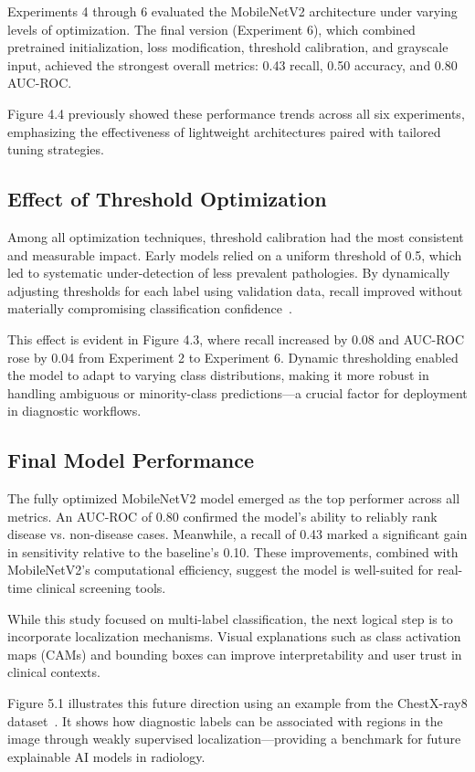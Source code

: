 \documentclass[12pt]{article}
\begin{document}
\begin{multicols}{2}
Experiments 4 through 6 evaluated the MobileNetV2 architecture under varying levels of optimization. The final version (Experiment 6), which combined pretrained initialization, loss modification, threshold calibration, and grayscale input, achieved the strongest overall metrics: 0.43 recall, 0.50 accuracy, and 0.80 AUC-ROC.

Figure 4.4 previously showed these performance trends across all six experiments, emphasizing the effectiveness of lightweight architectures paired with tailored tuning strategies.

\subsection{Effect of Threshold Optimization}
Among all optimization techniques, threshold calibration had the most consistent and measurable impact. Early models relied on a uniform threshold of 0.5, which led to systematic under-detection of less prevalent pathologies. By dynamically adjusting thresholds for each label using validation data, recall improved without materially compromising classification confidence~\cite{12}.

This effect is evident in Figure 4.3, where recall increased by 0.08 and AUC-ROC rose by 0.04 from Experiment 2 to Experiment 6. Dynamic thresholding enabled the model to adapt to varying class distributions, making it more robust in handling ambiguous or minority-class predictions—a crucial factor for deployment in diagnostic workflows.

\subsection{Final Model Performance}
The fully optimized MobileNetV2 model emerged as the top performer across all metrics. An AUC-ROC of 0.80 confirmed the model’s ability to reliably rank disease vs. non-disease cases. Meanwhile, a recall of 0.43 marked a significant gain in sensitivity relative to the baseline’s 0.10. These improvements, combined with MobileNetV2’s computational efficiency, suggest the model is well-suited for real-time clinical screening tools.

While this study focused on multi-label classification, the next logical step is to incorporate localization mechanisms. Visual explanations such as class activation maps (CAMs) and bounding boxes can improve interpretability and user trust in clinical contexts.


Figure 5.1 illustrates this future direction using an example from the ChestX-ray8 dataset~\cite{wang2017chestx}. It shows how diagnostic labels can be associated with regions in the image through weakly supervised localization—providing a benchmark for future explainable AI models in radiology.


\end{multicols}
\end{document}

